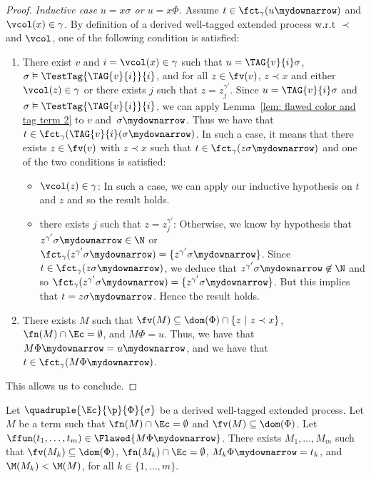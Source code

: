 \begin{proof}
\noindent \emph{Inductive case $u = x\sigma$ or $u = x\Phi$.} Assume $t \in \fct_\gamma(u\mydownarrow)$ and $\vcol(x) \in \gamma$.
By definition of a derived well-tagged extended process w.r.t $\prec$ and $\vcol$, one of the
following condition is satisfied:  
\begin{enumerate}
\item There exist $v$ and $i = \vcol(x) \in \gamma$ such that
  $u = \TAG{v}{i}\sigma$, $\sigma  \vDash
  \TestTag{\TAG{v}{i}}{i}$, and for all $z \in \fv(v)$, $z \prec x$ and either $\vcol(z) \in \gamma$ or there exists $j$ such that $z = z^{\gamma'}_j$.
  Since $u = \TAG{v}{i}\sigma$ and $\sigma \vDash
 \TestTag{\TAG{v}{i}}{i}$, we can apply Lemma~\ref{lem: flawed color and tag term 2}
 to $v$ and~$\sigma\mydownarrow$. Thus we have that $t \in \fct_\gamma(\TAG{v}{i}(\sigma\mydownarrow)$. In such a case, it means that there exists $z \in \fv(v)$ with $z \prec x$ such that $t \in \fct_\gamma(z\sigma\mydownarrow)$ and one of the two conditions is satisfied:
 \begin{itemize}
 \item $\vcol(z) \in \gamma$: In such a case, we can apply our inductive hypothesis on $t$ and $z$ and so the result holds.
 \item there exists $j$ such that $z = z^{\gamma'}_j$: Otherwise, we know by hypothesis that $z^{\gamma'}\sigma\mydownarrow \in \N$ or $\fct_\gamma(z^{\gamma'}\sigma\mydownarrow) = \{ z^{\gamma'}\sigma\mydownarrow\}$. Since $t \in \fct_\gamma(z\sigma\mydownarrow)$, we deduce that $z^{\gamma'}\sigma\mydownarrow \not\in \N$ and so $\fct_\gamma(z^{\gamma'}\sigma\mydownarrow) = \{ z^{\gamma'}\sigma\mydownarrow\}$. But this implies that $t = z\sigma\mydownarrow$. Hence the result holds.
 \end{itemize}
\item There exists $M$ such that $\fv(M) \subseteq \dom(\Phi) \cap \{z
  ~|~ z \prec x\}$, $\fn(M) \cap \Ec = \emptyset$, and $M\Phi =
  u$. Thus, we have that $M\Phi\mydownarrow = u\mydownarrow$, and we
  have that $t \in \fct_\gamma(M\Phi\mydownarrow)$.
\end{enumerate}
This allows us to conclude.
\end{proof}



\begin{lemma}
  \label{lem:flawed,smallerrecipe}
  Let $\quadruple{\Ec}{\p}{\Phi}{\sigma}$ be a derived well-tagged extended process. Let $M$ be a term such that $\fn(M) \cap \Ec = \emptyset$ and $\fv(M) \subseteq \dom(\Phi)$. Let $\ffun(t_1, \ldots, t_m) \in \Flawed{M\Phi\mydownarrow}$.  There exists $M_1, \ldots, M_m$ such that $\fv(M_k) \subseteq \dom(\Phi)$, $\fn(M_k) \cap \Ec = \emptyset$, $M_k\Phi\mydownarrow = t_k$, and $\M(M_k) < \M(M)$, for all $k \in \{1, \ldots, m\}$.
\end{lemma}



